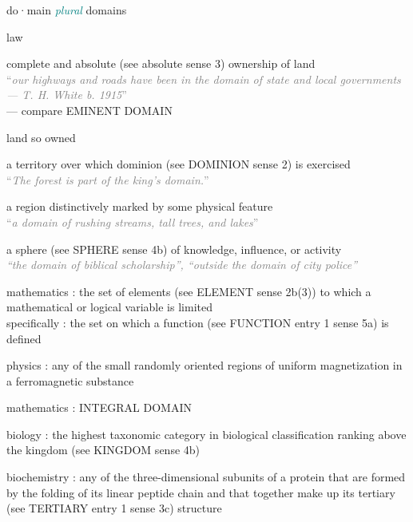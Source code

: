\documentclass[a4paper, DIV=13, BCOR=0cm]{scrbook}
\begin{document}
\begin{mdframed}[style=dictionary, frametitle={domain {\scriptsize\normalfont\textsc{noun \hfill Merriam-Webster}}}]
	{\small do·​main \textit{\textcolor{teal}{plural}} domains
			\begin{compactenum}
				\item law
				\begin{compactenum}
					\item complete and absolute (see absolute sense 3) ownership of land \\
					\textcolor{gray}{\enquote{\textit{our highways and roads have been in the domain of state and local governments— T. H. White b. 1915}}} \\
					 — compare EMINENT DOMAIN
					\item land so owned
				\end{compactenum}
				\item a territory over which dominion (see DOMINION sense 2) is exercised \\
				\textcolor{gray}{\enquote{\textit{The forest is part of the king's domain.}}}
				\item a region distinctively marked by some physical feature \\
				\textcolor{gray}{\enquote{\textit{a domain of rushing streams, tall trees, and lakes}}}
				\item a sphere (see SPHERE sense 4b) of knowledge, influence, or activity \\
				\textcolor{gray}{\textit{\enquote{the domain of biblical scholarship}, \enquote{outside the domain of city police}}}
				\item mathematics : the set of elements (see ELEMENT sense 2b(3)) to which a mathematical or logical variable is limited \\
				specifically : the set on which a function (see FUNCTION entry 1 sense 5a) is defined
				\item physics : any of the small randomly oriented regions of uniform magnetization in a ferromagnetic substance
				\item mathematics : INTEGRAL DOMAIN
				\item biology : the highest taxonomic category in biological classification ranking above the kingdom (see KINGDOM sense 4b)
				\item biochemistry : any of the three-dimensional subunits of a protein that are formed by the folding of its linear peptide chain and that together make up its tertiary (see TERTIARY entry 1 sense 3c) structure

\end{compactenum}}
\end{mdframed}
\end{document}
